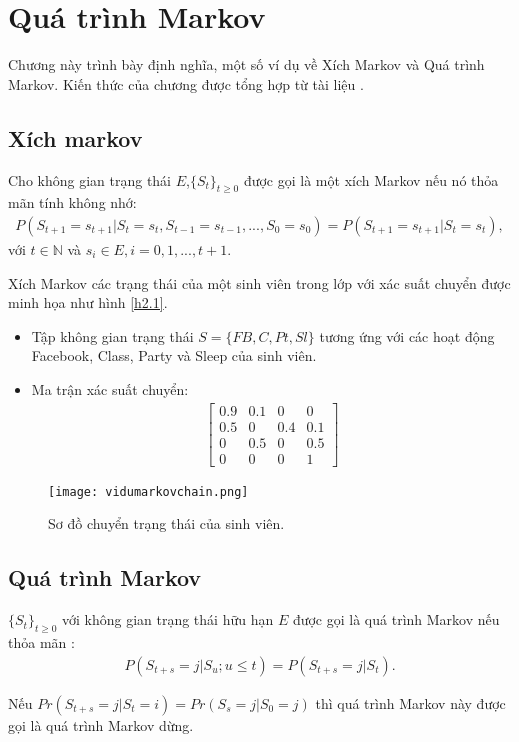 \chapter{Quá trình Markov}
\label{ch:02}
	Chương này trình bày định nghĩa, một số ví dụ về Xích Markov và Quá trình Markov. Kiến thức của chương được tổng hợp từ tài liệu \cite{Gagniuc2017}.
\section{Xích markov}
\begin{dn} \rm
Cho không gian trạng thái $E$,$\lbrace S_{t}\rbrace _{t\geq 0}$ được gọi là một xích Markov nếu nó thỏa mãn tính không nhớ:
\begin{align}
P(S_{t+1}=s_{t+1}|S_{t}=s_{t},S_{t-1}=s_{t-1},...,S_{0}=s_{0}) = P(S_{t+1}=s_{t+1}|S_{t}=s_{t}),
\end{align}
với $t\in \mathbb{N}$ và $s_{i} \in E, i = 0,1,...,t+1.$
\end{dn}

\begin{vd}
Xích Markov các trạng thái của một sinh viên trong lớp với xác suất chuyển được minh họa như hình \ref{h2.1}. 
\begin{itemize}
\item Tập không gian trạng thái $S = \lbrace FB,C,Pt,Sl \rbrace $ tương ứng với các hoạt động Facebook, Class, Party và Sleep của sinh viên.
\item Ma trận xác suất chuyển:
\begin{align*}
\begin{bmatrix}
0.9&  0.1&  0& 0\\ 
0.5&  0&  0.4& 0.1\\ 
0&  0.5& 0 & 0.5\\ 
0 & 0 & 0 & 1
\end{bmatrix}
\end{align*}
\end{itemize}
\newpage
\begin{figure}[ht] {\label{h2.1}}
    \centering
    \texttt{[image: vidumarkovchain.png]}
    \caption{Sơ đồ chuyển trạng thái của sinh viên.}
    \label{fig:tactumoitruong}
\end{figure}
\end{vd}
\section{Quá trình Markov}
\begin{dn} \rm
$\lbrace S_{t}\rbrace _{t\geq 0}$ với không gian trạng thái hữu hạn $E$ được gọi là quá trình Markov nếu thỏa mãn :
\begin{align}
P(S_{t+s}=j|S_{u};u\leq t)=P(S_{t+s}=j|S_{t}).
\end{align}
\end{dn}
\begin{nx} \rm
Nếu $Pr(S_{t+s}=j|S_{t}=i)=Pr(S_{s}=j|S_{0}=j)$ thì quá trình Markov này được gọi là quá trình Markov dừng.
\end{nx}